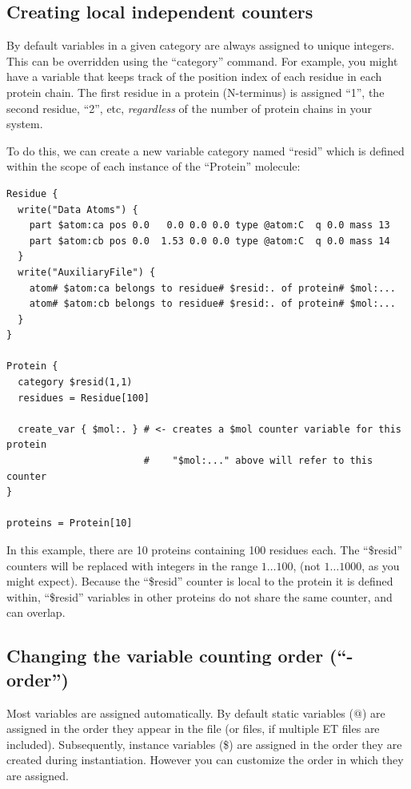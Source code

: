 \documentclass[11pt]{article}
\begin{document}
\subsection{Creating local independent counters}
\label{sec:cpath_simple}
By default variables in a given category are always assigned
to unique integers.
This can be overridden using the ``category'' command.
For example, you might have a variable that keeps track of
the position index of each residue in each protein chain.
The first residue in a protein (N-terminus) is assigned ``1'',
the second residue, ``2'', etc, 
\textit{regardless} of the number of protein chains in your system.

To do this, we can create a new variable category named ``resid'' which 
is defined within the scope of each instance of the ``Protein'' molecule:
\begin{verbatim}
Residue {
  write("Data Atoms") {
    part $atom:ca pos 0.0   0.0 0.0 0.0 type @atom:C  q 0.0 mass 13
    part $atom:cb pos 0.0  1.53 0.0 0.0 type @atom:C  q 0.0 mass 14
  }
  write("AuxiliaryFile") {
    atom# $atom:ca belongs to residue# $resid:. of protein# $mol:...
    atom# $atom:cb belongs to residue# $resid:. of protein# $mol:...
  }
}

Protein {
  category $resid(1,1)
  residues = Residue[100]

  create_var { $mol:. } # <- creates a $mol counter variable for this protein
                        #    "$mol:..." above will refer to this counter
}

proteins = Protein[10]
\end{verbatim}
In this example, there are 10 proteins containing 100 residues each.
The ``\$resid'' counters will be replaced with integers in the range
$1\ldots 100$,
(not $1\ldots 1000$, as you might expect).
Because the ``\$resid'' counter is local to the 
protein it is defined within,
``\$resid'' variables in other proteins do not share the same counter,
and can overlap.

\subsection{Changing the variable counting order (``-order'')}
\label{sec:order}
Most variables are assigned automatically. 
By default static variables (@) are assigned in the order 
they appear in the file (or files, if multiple ET files are included).
Subsequently, instance variables (\$)
are assigned in the order they are created during instantiation.
However you can customize the order in which they are assigned.
\end{document}
